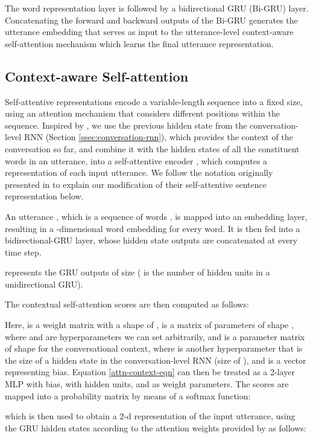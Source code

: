 \documentclass[11pt,a4paper]{article}
\begin{document}
The word representation layer is followed by a bidirectional GRU (Bi-GRU) layer. Concatenating the forward and backward outputs of the Bi-GRU generates the utterance embedding that serves as input to the utterance-level context-aware self-attention mechanism which learns the final utterance representation. 

\subsection{Context-aware Self-attention}
Self-attentive representations encode a variable-length sequence into a fixed size, using an attention mechanism that considers different positions within the sequence. 
Inspired by , we use the previous hidden state from the conversation-level RNN (Section \ref{ssec:conversation-rnn}), which provides the context of the conversation so far, and combine it with the hidden states of all the constituent words in an utterance, into a self-attentive encoder \cite{linal2017embediclr}, which computes a  representation of each input utterance. We follow the notation originally presented in  to explain our modification of their self-attentive sentence representation below.

An utterance , which is a sequence of  words , is mapped into an embedding layer, resulting in a -dimensional word embedding for every word. 
It is then fed into a bidirectional-GRU layer, whose hidden state outputs are concatenated at every time step.  






 represents the  GRU outputs of size  ( is the number of hidden units in a unidirectional GRU). 

The contextual self-attention scores are then computed as follows: 

Here,  is a weight matrix with a shape of ,  is a matrix of parameters of shape , where  and  are hyperparameters we can set arbitrarily, and  is a parameter matrix of shape  for the conversational context, where  is another hyperparameter that is the size of a hidden state in the conversation-level RNN (size of ), and  is a vector representing bias. Equation \ref{attn-context-eqn} can then be treated as a 2-layer MLP with bias, with  hidden units,  and  as weight parameters. 
The scores  are mapped into a probability matrix  by means of a softmax function: 

which is then used to obtain a 2-d representation  of the input utterance, using the GRU hidden states  according to the attention weights provided by  as follows: 
\end{document}
